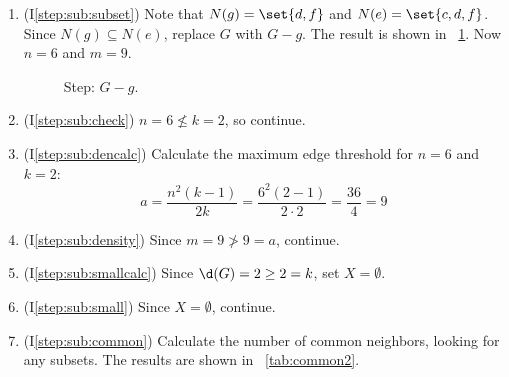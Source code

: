 \begin{enumerate}
\item (I\ref{step:sub:subset}) Note that \(N(g)=\set{d,f}\) and \(N(e)=\set{c,d,f}\).  Since \(N(g)\subseteq
  N(e)\), replace \(G\) with \(G-g\).  The result is shown in \figurename~\ref{fig:removeg}.  Now \(n=6\) and
  \(m=9\).

  \begin{figure}[H]
    \centering
    \caption{Step: \(G-g\).}
    \label{fig:removeg}
  \end{figure}

\item (I\ref{step:sub:check}) \(n=6\nleq k=2\), so continue.

\item (I\ref{step:sub:dencalc}) Calculate the maximum edge threshold for \(n=6\) and \(k=2\):
  \[a=\frac{n^2(k-1)}{2k}=\frac{6^2(2-1)}{2\cdot2}=\frac{36}{4}=9\]

\item (I\ref{step:sub:density}) Since \(m=9\ngtr9=a\), continue.

\item (I\ref{step:sub:smallcalc}) Since \(\d(G)=2\ge2=k\), set \(X=\emptyset\).

\item (I\ref{step:sub:small}) Since \(X=\emptyset\), continue.

\item (I\ref{step:sub:common}) Calculate the number of common neighbors, looking for any subsets.  The results are
  shown in \tablename~\ref{tab:common2}.


\end{enumerate}
